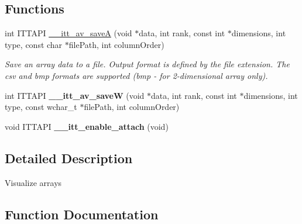 \subsection*{Functions}
\begin{DoxyCompactItemize}
\item 
int I\+T\+T\+A\+P\+I \hyperlink{group__arrays_ga36a1b96487c316dfa1d773fb5bf5e8af}{\+\_\+\+\_\+itt\+\_\+av\+\_\+save\+A} (void $\ast$data, int rank, const int $\ast$dimensions, int type, const char $\ast$file\+Path, int column\+Order)
\begin{DoxyCompactList}\small\item\em Save an array data to a file. Output format is defined by the file extension. The csv and bmp formats are supported (bmp -\/ for 2-\/dimensional array only). \end{DoxyCompactList}\item 
\hypertarget{group__arrays_ga06b495bcd228c1d087d07363fe60b350}{}int I\+T\+T\+A\+P\+I {\bfseries \+\_\+\+\_\+itt\+\_\+av\+\_\+save\+W} (void $\ast$data, int rank, const int $\ast$dimensions, int type, const wchar\+\_\+t $\ast$file\+Path, int column\+Order)\label{group__arrays_ga06b495bcd228c1d087d07363fe60b350}

\item 
\hypertarget{group__arrays_ga478fa1e11418e7ef53beddf9eac9f07d}{}void I\+T\+T\+A\+P\+I {\bfseries \+\_\+\+\_\+itt\+\_\+enable\+\_\+attach} (void)\label{group__arrays_ga478fa1e11418e7ef53beddf9eac9f07d}

\end{DoxyCompactItemize}


\subsection{Detailed Description}
Visualize arrays 

\subsection{Function Documentation}
\hypertarget{group__arrays_ga36a1b96487c316dfa1d773fb5bf5e8af}{}
